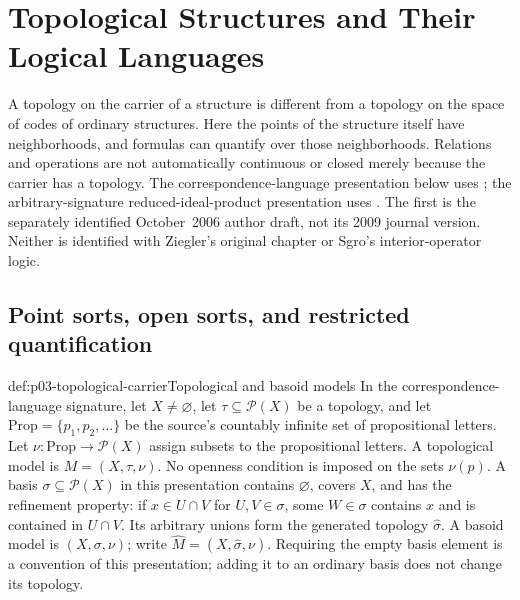 \chapter{Topological Structures and Their Logical Languages}
\label{sec:p03-topological-model-theory}

A topology on the carrier of a structure is different from a topology on
the space of codes of ordinary structures. Here the points of the structure
itself have neighborhoods, and formulas can quantify over those
neighborhoods. Relations and operations are not automatically continuous
or closed merely because the carrier has a topology.
The correspondence-language presentation below uses
\cite[\S2.3, pp.~7--12]{TenCateGabelaiaSustretov2006TopologyDraft};
the arbitrary-signature reduced-ideal-product presentation uses
\cite[\S\S1--2]{GrulovicKurilic2001TopologicalFV}.
The first is the separately identified October~2006 author draft, not its
2009 journal version. Neither is identified with Ziegler's original chapter
or Sgro's interior-operator logic.

\section{Point sorts, open sorts, and restricted quantification}

\begin{hbdefinition}{def:p03-topological-carrier}{Topological and basoid models}
In the correspondence-language signature, let \(X\ne\varnothing\),
let \(\tau\subseteq\mathcal P(X)\) be a topology, and let
\(\mathrm{Prop}=\{p_1,p_2,\ldots\}\) be the source's countably
infinite set of propositional letters. Let
\(\nu:\mathrm{Prop}\to\mathcal P(X)\) assign subsets to the
propositional letters. A topological model is \(M=(X,\tau,\nu)\).
No openness condition is imposed on the sets \(\nu(p)\).
A basis \(\sigma\subseteq\mathcal P(X)\) in this presentation contains
\(\varnothing\), covers \(X\), and has the refinement property:
if \(x\in U\cap V\) for \(U,V\in\sigma\), some
\(W\in\sigma\) contains \(x\) and is contained in \(U\cap V\).
Its arbitrary unions form the generated topology \(\widehat\sigma\).
A basoid model is \((X,\sigma,\nu)\); write
\(\widehat M=(X,\widehat\sigma,\nu)\).
Requiring the empty basis element is a convention of this presentation;
adding it to an ordinary basis does not change its topology.
\end{hbdefinition}

